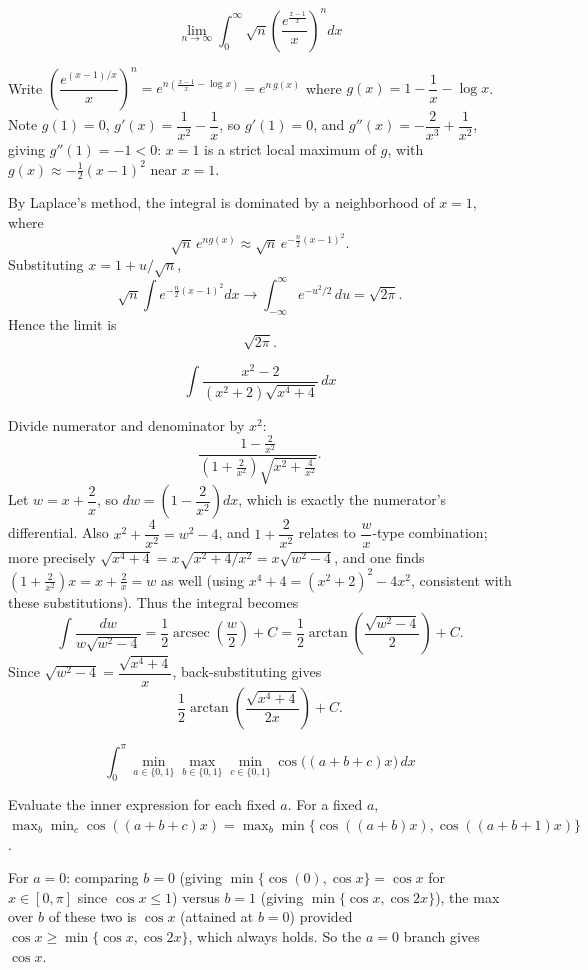\begin{questions}

\question
\[
\lim_{n\to\infty}\int_0^{\infty}\sqrt n\left(\frac{e^{\frac{x-1}{x}}}{x}\right)^{n}dx
\]
\begin{solution}
Write $\left(\dfrac{e^{(x-1)/x}}{x}\right)^n=e^{n\left(\frac{x-1}{x}-\log x\right)}=e^{n\,g(x)}$ where $g(x)=1-\dfrac1x-\log x$. Note $g(1)=0$, $g'(x)=\dfrac{1}{x^2}-\dfrac1x$, so $g'(1)=0$, and $g''(x)=-\dfrac{2}{x^3}+\dfrac1{x^2}$, giving $g''(1)=-1<0$: $x=1$ is a strict local maximum of $g$, with $g(x)\approx -\tfrac12(x-1)^2$ near $x=1$.

By Laplace's method, the integral is dominated by a neighborhood of $x=1$, where
\[
\sqrt n\, e^{ng(x)}\approx \sqrt n\,e^{-\frac n2(x-1)^2}.
\]
Substituting $x=1+u/\sqrt n$,
\[
\sqrt n\int e^{-\frac n2(x-1)^2}dx\to \int_{-\infty}^{\infty} e^{-u^2/2}\,du=\sqrt{2\pi}.
\]
Hence the limit is
\[
\sqrt{2\pi}.
\]
\end{solution}

\question
\[
\int \frac{x^{2}-2}{(x^{2}+2)\sqrt{x^{4}+4}}\,dx
\]
\begin{solution}
Divide numerator and denominator by $x^2$:
\[
\frac{1-\frac2{x^2}}{\left(1+\frac2{x^2}\right)\sqrt{x^2+\frac4{x^2}}}.
\]
Let $w=x+\dfrac2x$, so $dw=\left(1-\dfrac2{x^2}\right)dx$, which is exactly the numerator's differential. Also $x^2+\dfrac4{x^2}=w^2-4$, and $1+\dfrac{2}{x^2}$ relates to $\dfrac{w}{x}$-type combination; more precisely $\sqrt{x^4+4}=x\sqrt{x^2+4/x^2}=x\sqrt{w^2-4}$, and one finds $\left(1+\frac2{x^2}\right)x=x+\frac2x=w$ as well (using $x^4+4=(x^2+2)^2-4x^2$, consistent with these substitutions). Thus the integral becomes
\[
\int \frac{dw}{w\sqrt{w^2-4}}=\frac12\operatorname{arcsec}\!\left(\frac w2\right)+C=\frac12\arctan\!\left(\frac{\sqrt{w^2-4}}{2}\right)+C.
\]
Since $\sqrt{w^2-4}=\dfrac{\sqrt{x^4+4}}{x}$, back-substituting gives
\[
\frac12\arctan\!\left(\frac{\sqrt{x^4+4}}{2x}\right)+C.
\]
\end{solution}

\question
\[
\int_0^{\pi} \min_{a\in\{0,1\}}\max_{b\in\{0,1\}}\min_{c\in\{0,1\}}\cos\big((a+b+c)x\big)\,dx
\]
\begin{solution}
Evaluate the inner expression for each fixed $a$. For a fixed $a$, $\max_{b}\min_{c}\cos((a+b+c)x)=\max_b\min\{\cos((a+b)x),\cos((a+b+1)x)\}$.

For $a=0$: comparing $b=0$ (giving $\min\{\cos(0),\cos x\}=\cos x$ for $x\in[0,\pi]$ since $\cos x\le1$) versus $b=1$ (giving $\min\{\cos x,\cos2x\}$), the max over $b$ of these two is $\cos x$ (attained at $b=0$) provided $\cos x\ge \min\{\cos x,\cos2x\}$, which always holds. So the $a=0$ branch gives $\cos x$.


\end{solution}
\end{questions}
